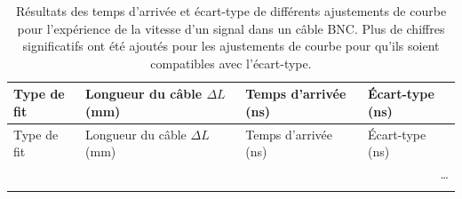 \begin{longtable}{p{2.0cm} p{2.0cm} p{4.0cm} p{2.0cm}}
    \caption{Résultats des temps d'arrivée et écart-type de différents 
    ajustements de courbe pour l'expérience de la vitesse d'un signal dans un câble 
    BNC. Plus de chiffres significatifs ont été ajoutés pour les 
    ajustements de courbe pour qu'ils soient compatibles avec 
    l'écart-type.} \\
    \toprule
    \label{table:BNC-fits}
    Type de fit & Longueur du câble $\Delta L$ (mm) & Temps d'arrivée (ns) & Écart-type (ns) \\
    \midrule
    \endfirsthead
    
    \toprule
    Type de fit & Longueur du câble $\Delta L$ (mm) & Temps d'arrivée (ns) & Écart-type (ns) \\
    \midrule
    \endhead
    
    \midrule
    \multicolumn{4}{r}{{\dots}} \\
    \midrule
    \endfoot
    
    \bottomrule
    \endlastfoot
    

\end{longtable}

